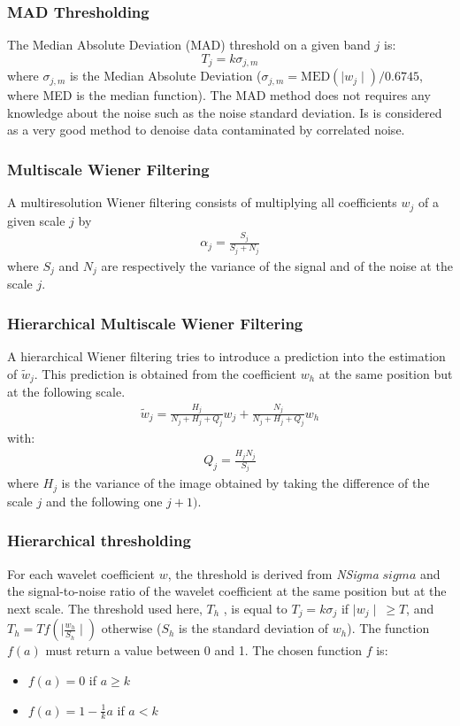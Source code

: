 \begin{itemize}
\subsubsection*{MAD Thresholding}
The Median Absolute Deviation (MAD) threshold on a given band $j$ is:
\[T_j =  k \sigma_{j,m} \] 
where $\sigma_{j,m}$ is the Median
Absolute Deviation ($\sigma_{j,m} = \mbox{MED}( \mid w_j \mid ) / 0.6745$,
where MED is the median function).
The MAD method does not requires any knowledge about the noise such as the 
noise standard deviation. Is is considered as a very good method to 
denoise data contaminated by correlated noise.

\subsubsection*{Multiscale Wiener Filtering}
A multiresolution Wiener filtering \cite{starck:sta94_4} consists of 
multiplying all coefficients $w_j$ of a given scale $j$ by 
\begin{eqnarray}
\alpha_j = \frac{S_j}{S_j + N_j}
\end{eqnarray}
where $S_j$ and $N_j$ are respectively the variance of the signal 
and of the noise at the scale $j$.

\subsubsection*{Hierarchical Multiscale Wiener Filtering}
A hierarchical Wiener filtering \cite{starck:sta94_4} tries to 
introduce a prediction 
into the estimation of $\tilde w_j$. This prediction is obtained from 
the coefficient $w_h$ at the same position but at the following scale.
\begin{eqnarray}
\tilde w_j = \frac{H_j}{N_j+H_j+Q_j} w_j + \frac{N_j}{N_j+H_j+Q_j} w_h
\end{eqnarray}
with:
\begin{eqnarray}
Q_j = \frac{H_jN_j}{S_j}
\end{eqnarray}
where $H_j$ is the variance of the image obtained by taking the difference
of the scale $j$ and the following one $j+1)$.

\subsubsection*{Hierarchical thresholding}
For each wavelet coefficient $w$, the threshold is derived from {\em NSigma} 
$sigma$ and the signal-to-noise 
ratio of the wavelet coefficient at the same position but
at the next scale. 
The threshold used here, $T_h$ \cite{starck:sta94_4}, is equal 
to $T_j=k \sigma_j$ if $\mid w_j \mid \ \geq T$,
and $T_h = T f(\mid\frac{w_h}{S_h}\mid)$ otherwise
($S_h$ is the standard deviation of $w_h$). The function $f(a)$
must return a value between 0 and 1. The chosen function $f$ is:
\begin{itemize}
\item $f(a) = 0$ if $a \geq k$  
\item $f(a) = 1 - \frac{1}{k} a$ if $a < k$  
\end{itemize}


\end{itemize}
